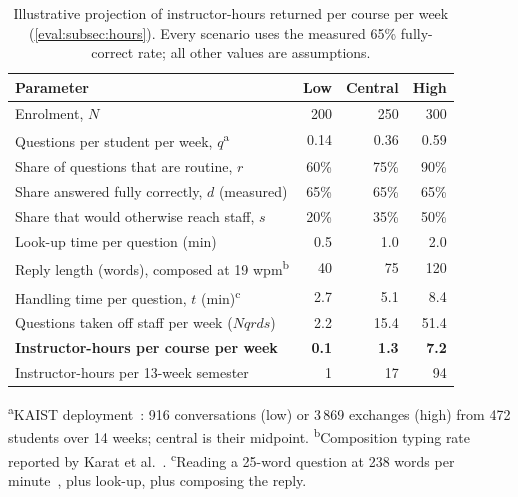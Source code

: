 \begin{table}[htb]
  \centering
  \caption{Illustrative projection of instructor-hours returned per course per
           week (\autoref{eval:subsec:hours}). Every scenario uses the measured
           65\% fully-correct rate; all other values are assumptions.}
  \label{append:tab:hours}
  \footnotesize
  \renewcommand{\arraystretch}{1.25}
  \begin{tabular}{L{0.42\textwidth} r r r}
    \hline
    \textbf{Parameter} & \textbf{Low} & \textbf{Central} & \textbf{High} \\
    \hline
    Enrolment, $N$                                         & 200  & 250  & 300  \\
    Questions per student per week, $q$\textsuperscript{a} & 0.14 & 0.36 & 0.59 \\
    Share of questions that are routine, $r$               & 60\% & 75\% & 90\% \\
    Share answered fully correctly, $d$ (measured)         & 65\% & 65\% & 65\% \\
    Share that would otherwise reach staff, $s$            & 20\% & 35\% & 50\% \\
    Look-up time per question (min)                        & 0.5  & 1.0  & 2.0  \\
    Reply length (words), composed at 19 wpm\textsuperscript{b} & 40 & 75 & 120 \\
    Handling time per question, $t$ (min)\textsuperscript{c} & 2.7 & 5.1 & 8.4 \\
    \hline
    Questions taken off staff per week ($N q r d s$)        & 2.2  & 15.4 & 51.4 \\
    \textbf{Instructor-hours per course per week}          & \textbf{0.1} & \textbf{1.3} & \textbf{7.2} \\
    Instructor-hours per 13-week semester                  & 1    & 17   & 94   \\
    \hline
\end{tabular}

  \vspace{4pt}
  \parbox{0.86\textwidth}{\scriptsize
    \textsuperscript{a}KAIST deployment~\cite{acl25:Kweon}: 916 conversations
    (low) or 3\,869 exchanges (high) from 472 students over 14 weeks; central is
    their midpoint.
    \textsuperscript{b}Composition typing rate reported by Karat et
    al.~\cite{chi99:Karat}.
    \textsuperscript{c}Reading a 25-word question at 238 words per
    minute~\cite{jml19:Brysbaert}, plus look-up, plus composing the reply.}
\end{table}
